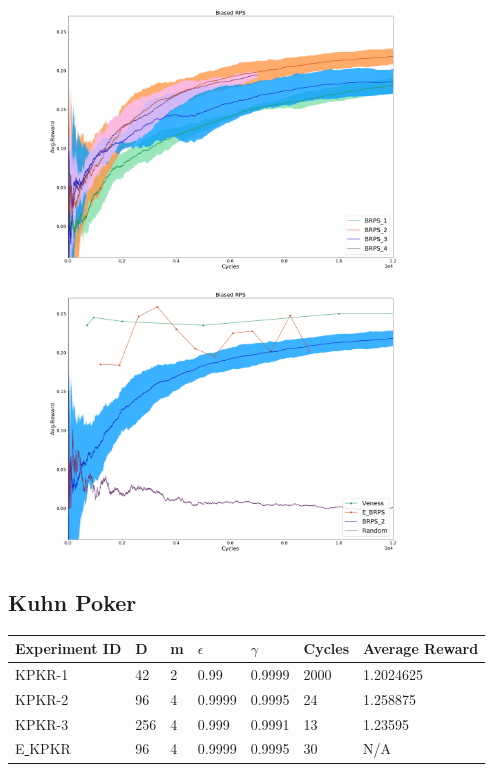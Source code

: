 \documentclass{article}
\theoremstyle{definition}
\newtheorem{primary statistics}[definition]{Primary Statistics}
\newtheorem{auxiliary statistics}[definition]{Auxiliary Statistics}
\begin{document}
 \begin{figure}[h]
 \centering
    \includegraphics[width=9.3cm]{4_Biased_RPS}
\end{figure}

\begin{figure}[h]
\centering
    \includegraphics[width=9.3cm]{Biased_RPS}
\end{figure}

\newpage

\subsection{Kuhn Poker}

\begin{tabular}{|l|l|l|l|l|l|l|}
\hline \centering 
  Experiment ID& D & m & $\epsilon$ & $\gamma$ & Cycles & Average Reward \\ \hline
KPKR-1  & 42        & 2           & 0.99        & 0.9999            & 2000   & 1.2024625        \\ \hline
KPKR-2  & 96        & 4           & 0.9999      & 0.9995            & 24     & 1.258875         \\ \hline
KPKR-3  & 256       & 4           & 0.999       & 0.9991            & 13     & 1.23595         \\ \hline
E\underline{ }KPKR  & 96       & 4           & 0.9999       & 0.9995            & 30     & N/A         \\ \hline
\end{tabular}
\end{document}
